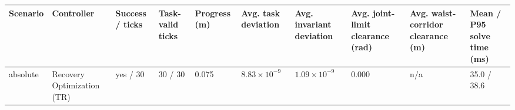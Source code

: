 \begin{tabular}{llllllllll}
\toprule
Scenario & Controller & Success / ticks & Task-valid ticks & Progress (m) & Avg. task deviation & Avg. invariant deviation & Avg. joint-limit clearance (rad) & Avg. waist-corridor clearance (m) & Mean / P95 solve time (ms) \\
\midrule
absolute & Recovery Optimization (TR) & yes / 30 & 30 / 30 & 0.075 & $8.83\times 10^{-9}$ & $1.09\times 10^{-9}$ & 0.000 & n/a & 35.0 / 38.6 \\
\bottomrule
\end{tabular}
